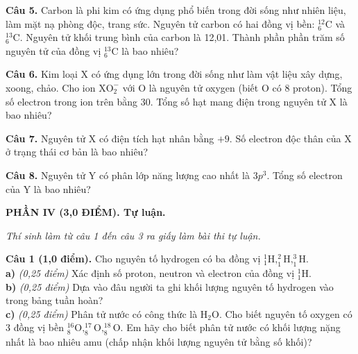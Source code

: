 \documentclass[13pt,a4paper]{article}
\begin{document}
\textbf{Câu 5.} Carbon là phi kim có ứng dụng phổ biến trong đời sống như nhiên liệu, làm mặt nạ phòng độc, trang sức. Nguyên tử carbon có hai đồng vị bền: $^{12}_6\text{C}$ và $^{13}_6\text{C}$. Nguyên tử khối trung bình của carbon là 12,01. Thành phần phần trăm số nguyên tử của đồng vị $^{13}_6\text{C}$ là bao nhiêu?\\
\vspace{1.8cm}

\textbf{Câu 6.} Kim loại X có ứng dụng lớn trong đời sống như làm vật liệu xây dựng, xoong, chảo. Cho ion $\text{XO}_2^-$ với O là nguyên tử oxygen (biết O có 8 proton). Tổng số electron trong ion trên bằng 30. Tổng số hạt mang điện trong nguyên tử X là bao nhiêu?\\
\vspace{1.8cm}

\textbf{Câu 7.} Nguyên tử X có điện tích hạt nhân bằng $+9$. Số electron độc thân của X ở trạng thái cơ bản là bao nhiêu?\\
\vspace{1.8cm}

\textbf{Câu 8.} Nguyên tử Y có phân lớp năng lượng cao nhất là $3p^3$. Tổng số electron của Y là bao nhiêu?\\
\vspace{1.8cm}

\vspace{6pt}
{\color{myGreen}\bfseries\large PHẦN IV (3,0 ĐIỂM). Tự luận.}

\textit{\small Thí sinh làm từ câu 1 đến câu 3 ra giấy làm bài thi tự luận.}
\vspace{3pt}

\textbf{Câu 1 (1,0 điểm).} Cho nguyên tố hydrogen có ba đồng vị $^1_1\text{H}, ^2_1\text{H}, ^3_1\text{H}$.\\
\textbf{a)} \textit{(0,25 điểm)} Xác định số proton, neutron và electron của đồng vị $^1_1\text{H}$.\\

\textbf{b)} \textit{(0,25 điểm)} Dựa vào đâu người ta ghi khối lượng nguyên tố hydrogen vào trong bảng tuần hoàn?\\

\textbf{c)} \textit{(0,25 điểm)} Phân tử nước có công thức là $\text{H}_2\text{O}$. Cho biết nguyên tố oxygen có 3 đồng vị bền $^{16}_8\text{O}, ^{17}_8\text{O}, ^{18}_8\text{O}$. Em hãy cho biết phân tử nước có khối lượng nặng nhất là bao nhiêu amu (chấp nhận khối lượng nguyên tử bằng số khối)?\\
\end{document}
